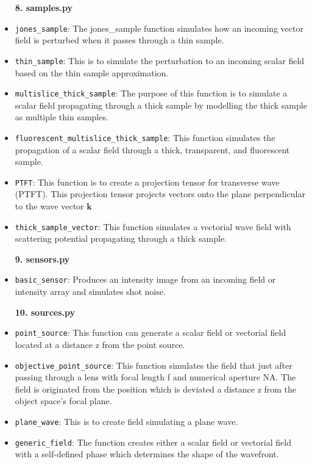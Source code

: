 \documentclass[a4paper,12pt]{report}
\begin{document}
\begin{itemize}
    \vspace{1em}
    {\large \textbf{8. samples.py}}
    \item \texttt{jones\_sample}: The jones\_sample function simulates how an incoming vector field is perturbed when it passes through a thin sample.
    \item \texttt{thin\_sample}: This is to simulate the perturbation to an incoming scalar field based on the thin sample approximation.
    \item \texttt{multislice\_thick\_sample}: The purpose of this function is to simulate a scalar field propagating through a thick sample by modelling the thick sample as multiple thin samples.
    \item \texttt{fluorescent\_multislice\_thick\_sample}: This function simulates the propagation of a scalar field through a thick, transparent, and fluorescent sample.
    \item \texttt{PTFT}: This function is to create a projection tensor for transverse wave (PTFT). This projection tensor projects vectors onto the plane perpendicular to the wave vector $\textbf{k}$
    \item \texttt{thick\_sample\_vector}: This function simulates a vectorial wave field with scattering potential propagating through a thick sample.
    
    \vspace{1em}
    {\large \textbf{9. sensors.py}}
    \item \texttt{basic\_sensor}:  Produces an intensity image from an incoming field or intensity array and simulates shot noise.
    
    \vspace{1em}
    {\large \textbf{10. sources.py}}
    \item \texttt{point\_source}: This function can generate a scalar field or vectorial field located at a distance z from the point source.
    \item \texttt{objective\_point\_source}: This function simulates the field that just after passing through a lens with focal length f and numerical aperture NA. The field is originated from the position which is deviated a distance z from the object space's focal plane.
    \item \texttt{plane\_wave}: This is to create field simulating a plane wave.
    \item \texttt{generic\_field}: The function creates either a scalar field or vectorial field with a self-defined phase which determines the shape of the wavefront.
\end{itemize}
\end{document}
